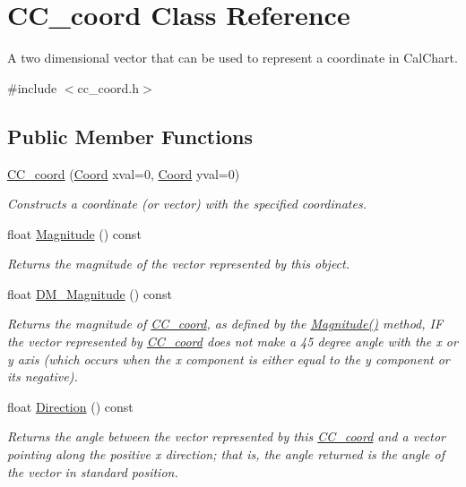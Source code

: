 \hypertarget{a00029}{\section{C\-C\-\_\-coord Class Reference}
\label{a00029}
}


A two dimensional vector that can be used to represent a coordinate in Cal\-Chart.  




{\ttfamily \#include $<$cc\-\_\-coord.\-h$>$}

\subsection*{Public Member Functions}
\begin{DoxyCompactItemize}
\item 
\hyperlink{a00029_a69194d9f67638d9a89c9288924b0f9e2}{C\-C\-\_\-coord} (\hyperlink{a00216_acd9dae57b712df0e2d3588c0c4798c11}{Coord} xval=0, \hyperlink{a00216_acd9dae57b712df0e2d3588c0c4798c11}{Coord} yval=0)
\begin{DoxyCompactList}\small\item\em Constructs a coordinate (or vector) with the specified coordinates. \end{DoxyCompactList}\item 
float \hyperlink{a00029_ad64566e6ad9d6515d0393f6e886f1f6e}{Magnitude} () const 
\begin{DoxyCompactList}\small\item\em Returns the magnitude of the vector represented by this object. \end{DoxyCompactList}\item 
float \hyperlink{a00029_ac197fb1a92a5f468d91c19b0e28576a0}{D\-M\-\_\-\-Magnitude} () const 
\begin{DoxyCompactList}\small\item\em Returns the magnitude of \hyperlink{a00029}{C\-C\-\_\-coord}, as defined by the \hyperlink{a00029_ad64566e6ad9d6515d0393f6e886f1f6e}{Magnitude()} method, I\-F the vector represented by \hyperlink{a00029}{C\-C\-\_\-coord} does not make a 45 degree angle with the x or y axis (which occurs when the x component is either equal to the y component or its negative). \end{DoxyCompactList}\item 
float \hyperlink{a00029_a508c84e70e6f919e7badc4ca72e27516}{Direction} () const 
\begin{DoxyCompactList}\small\item\em Returns the angle between the vector represented by this \hyperlink{a00029}{C\-C\-\_\-coord} and a vector pointing along the positive x direction; that is, the angle returned is the angle of the vector in standard position. \end{DoxyCompactList}\item 

\end{DoxyCompactItemize}
